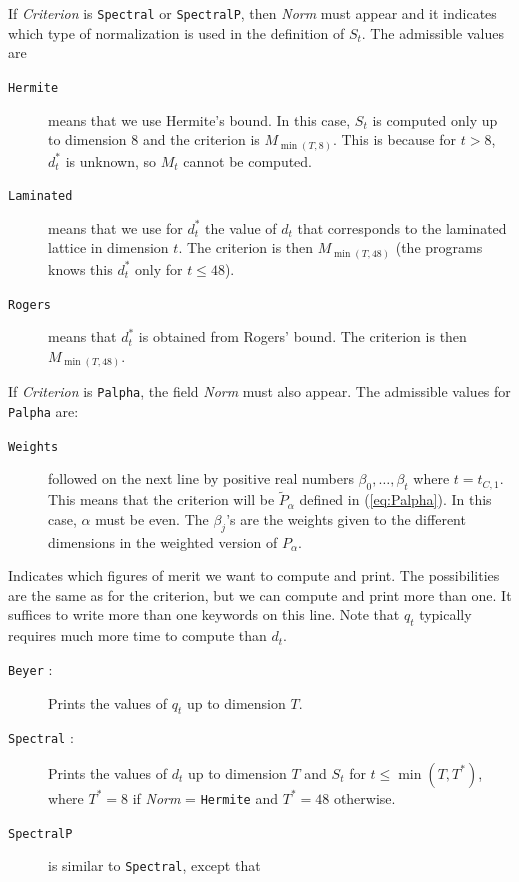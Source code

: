 \begin {description}
  If {\em Criterion\/} is {\tt Spectral} or {\tt SpectralP}, 
  then {\em Norm\/}
  must appear and it indicates which type of normalization is used
  in the definition of $S_t$.  The admissible values are
  \begin {description}
  \item [{\tt Hermite}] means that we use Hermite's bound.
    In this case, $S_t$ is computed only up to dimension 8
    and the criterion is $M_{\min(T, 8)}$.  
    This is because for $t>8$, $d_t^*$ is
    unknown, so $M_t$ cannot be computed.
  \item  [{\tt Laminated}] means that we use for $d_t^*$ the value
    of $d_t$ that corresponds to the laminated lattice in dimension $t$.
    The criterion is then $M_{\min(T, 48)}$ 
    (the programs knows this $d_t^*$ only for $t\le 48$).
  \item  [{\tt Rogers}] means that $d_t^*$ is obtained from Rogers'
    bound.  The criterion is then $M_{\min(T, 48)}$.
  \end {description}
  If {\em Criterion\/} is {\tt Palpha}, the field {\em Norm} must also
  appear.  The admissible values for {\tt Palpha} are:
  \begin {description}
  \item [{\tt Weights}] followed on the next line by positive real numbers 
  $\beta_0,\dots,\beta_t$ where $t= t_{C,1}$.  This means that the criterion
  will be $\tilde P_{\alpha}$ defined in (\ref{eq:Palpha}).
  In this case, $\alpha$ must be even.  The $\beta_j$'s are the weights
  given to the different dimensions in the weighted version of $P_{\alpha}$.
  \end {description}
%
\item [{\em LatticeInfo} :]
  Indicates which figures of merit we want to compute and print.
  The possibilities are the same as for the criterion, but we can compute
  and print more than one.  It suffices to write more than one keywords
  on this line.
  Note that $q_t$ typically requires much more time to compute than $d_t$.
  \begin {description}
  \item [{\tt Beyer} :] Prints the values of $q_t$ up to dimension $T$.
  \item [{\tt Spectral} :] Prints the values of $d_t$ up to dimension $T$ and
    $S_t$ for $t\le\min (T, T^*)$, where $T^*=8$ if {\em Norm} = 
    {\tt Hermite} and $T^* = 48$ otherwise.
  \item [{\tt SpectralP}] is similar to {\tt Spectral}, except that

\end{description}
\end{description}
